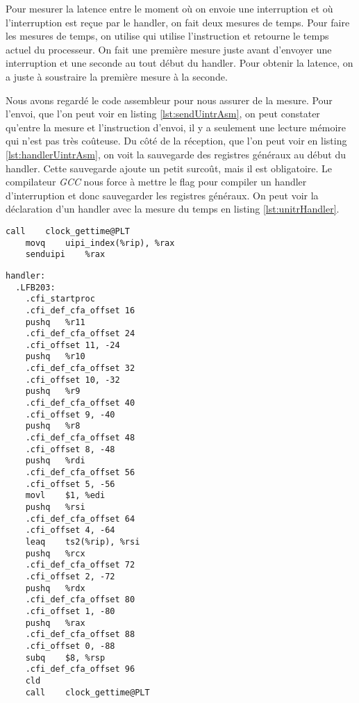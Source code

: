 Pour mesurer la latence entre le moment où on envoie une interruption et où l'interruption est reçue par le handler,
on fait deux mesures de temps.
Pour faire les mesures de temps, on utilise  qui utilise l'instruction  et retourne le temps actuel du processeur.
On fait une première mesure juste avant d'envoyer une interruption et une seconde au tout début du handler.
Pour obtenir la latence, on a juste à soustraire la première mesure à la seconde.

Nous avons regardé le code assembleur pour nous assurer de la mesure.
Pour l'envoi, que l'on peut voir en listing \ref{lst:sendUintrAsm}, on peut constater qu'entre la mesure et l'instruction d'envoi,
il y a seulement une lecture mémoire qui n'est pas très coûteuse.
Du côté de la réception, que l'on peut voir en listing \ref{lst:handlerUintrAsm},
on voit la sauvegarde des registres généraux au début du handler.
Cette sauvegarde ajoute un petit surcoût, mais il est obligatoire.
Le compilateur \emph{GCC} nous force à mettre le flag  pour compiler un handler d'interruption et donc sauvegarder les registres généraux.
On peut voir la déclaration d'un handler avec la mesure du temps en listing \ref{lst:unitrHandler}.

\begin{lstlisting}[language={[x86masm]Assembler}, caption=Code assembleur de l'envoi d'\uintr{}, label={lst:sendUintrAsm}]
	call	clock_gettime@PLT
	movq	uipi_index(%rip), %rax
	senduipi	%rax
\end{lstlisting}


\begin{lstlisting}[language={[x86masm]Assembler}, caption=Code assembleur de l'handler \uintr{}, label={lst:handlerUintrAsm}]
  handler:
  .LFB203:
    .cfi_startproc
    .cfi_def_cfa_offset 16
    pushq	%r11
    .cfi_def_cfa_offset 24
    .cfi_offset 11, -24
    pushq	%r10
    .cfi_def_cfa_offset 32
    .cfi_offset 10, -32
    pushq	%r9
    .cfi_def_cfa_offset 40
    .cfi_offset 9, -40
    pushq	%r8
    .cfi_def_cfa_offset 48
    .cfi_offset 8, -48
    pushq	%rdi
    .cfi_def_cfa_offset 56
    .cfi_offset 5, -56
    movl	$1, %edi
    pushq	%rsi
    .cfi_def_cfa_offset 64
    .cfi_offset 4, -64
    leaq	ts2(%rip), %rsi
    pushq	%rcx
    .cfi_def_cfa_offset 72
    .cfi_offset 2, -72
    pushq	%rdx
    .cfi_def_cfa_offset 80
    .cfi_offset 1, -80
    pushq	%rax
    .cfi_def_cfa_offset 88
    .cfi_offset 0, -88
    subq	$8, %rsp
    .cfi_def_cfa_offset 96
    cld
    call	clock_gettime@PLT
\end{lstlisting}

